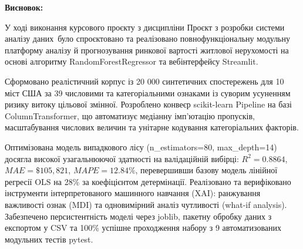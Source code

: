 \documentclass[14pt,a4paper]{extarticle}
\begin{document}
\vspace{6pt}
\noindent\textbf{Висновок:}

У ході виконання курсового проєкту з дисципліни \textquotedbl Проєкт з розробки системи аналізу даних\textquotedbl~було спроєктовано та реалізовано повнофункціональну модульну платформу аналізу й прогнозування ринкової вартості житлової нерухомості на основі алгоритму RandomForestRegressor та вебінтерфейсу Streamlit. 

Сформовано реалістичний корпус із 20 000 синтетичних спостережень для 10 міст США за 39 числовими та категоріальними ознаками із суворим усуненням ризику витоку цільової змінної. Розроблено конвеєр scikit-learn Pipeline на базі ColumnTransformer, що автоматизує медіанну імп'ютацію пропусків, масштабування числових величин та унітарне кодування категоріальних факторів. 

Оптимізована модель випадкового лісу (n\_estimators=80, max\_depth=14) досягла високої узагальнюючої здатності на валідаційній вибірці: $R^2 = 0.8864$, $MAE = \$105,821$, $MAPE = 12.84\%$, перевершивши базову модель лінійної регресії OLS на 28\% за коефіцієнтом детермінації. Реалізовано та верифіковано інструменти інтерпретованого машинного навчання (XAI): ранжування важливості ознак (MDI) та одновимірний аналіз чутливості (what-if analysis). Забезпечено персистентність моделі через joblib, пакетну обробку даних з експортом у CSV та 100\% успішне проходження набору з 9 автоматизованих модульних тестів pytest.
\end{document}
